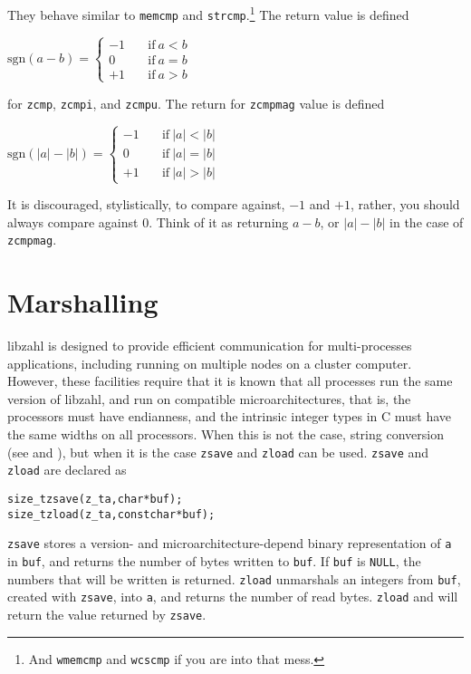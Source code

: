 \noindent
They behave similar to {\tt memcmp} and
{\tt strcmp}.\footnote{And {\tt wmemcmp} and
{\tt wcscmp} if you are into that mess.}
The return value is defined

\vspace{1em}
\(
    \mbox{sgn}(a - b) =
    \left \lbrace \begin{array}{rl}
        -1 & \quad \textrm{if}~a < b \\
         0 & \quad \textrm{if}~a = b \\
        +1 & \quad \textrm{if}~a > b
    \end{array} \right .
\)
\vspace{1em}

\noindent
for {\tt zcmp}, {\tt zcmpi}, and {\tt zcmpu}.
The return for {\tt zcmpmag} value is defined

\vspace{1em}
\(
    \mbox{sgn}(\lvert a \rvert - \lvert b \rvert) =
    \left \lbrace \begin{array}{rl}
        -1 & \quad \textrm{if}~\lvert a \rvert < \lvert b \rvert \\
         0 & \quad \textrm{if}~\lvert a \rvert = \lvert b \rvert \\
        +1 & \quad \textrm{if}~\lvert a \rvert > \lvert b \rvert
    \end{array} \right .
\)
\vspace{1em}

\noindent
It is discouraged, stylistically, to compare
against, $-1$ and $+1$, rather, you should
always compare against $0$. Think of it as
returning $a - b$, or $\lvert a \rvert - \lvert b \rvert$
in the case of {\tt zcmpmag}.


\newpage
\section{Marshalling}
\label{sec:Marshalling}

libzahl is designed to provide efficient communication
for multi-processes applications, including running on
multiple nodes on a cluster computer. However, these
facilities require that it is known that all processes
run the same version of libzahl, and run on compatible
microarchitectures, that is, the processors must have
endianness, and the intrinsic integer types in C must
have the same widths on all processors. When this is not
the case, string conversion (see 
and ), but when it is the case
{\tt zsave} and {\tt zload} can be used. {\tt zsave} and
{\tt zload} are declared as

\begin{alltt}
   size_t zsave(z_t a, char *buf);
   size_t zload(z_t a, const char *buf);
\end{alltt}

\noindent
{\tt zsave} stores a version- and microarchitecture-depend
binary representation of {\tt a} in {\tt buf}, and returns
the number of bytes written to {\tt buf}. If {\tt buf} is
{\tt NULL}, the numbers that will be written is returned.
{\tt zload} unmarshals an integers from {\tt buf}, created
with {\tt zsave}, into {\tt a}, and returns the number of
read bytes. {\tt zload} and will return the value returned
by {\tt zsave}.
